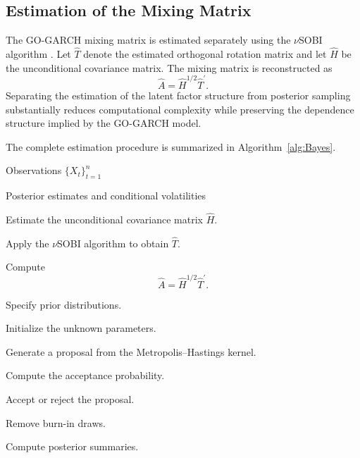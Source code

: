 \documentclass[twoside]{article}
\begin{document}
\subsection{Estimation of the Mixing Matrix}

The GO-GARCH mixing matrix is estimated separately using the \(\nu\)SOBI algorithm \cite{Miettinen2015}. Let \(\widehat{T}\) denote the estimated orthogonal rotation matrix and let \(\widehat{H}\) be the unconditional covariance matrix. The mixing matrix is reconstructed as
\[
\widehat{A}
=
\widehat{H}^{1/2}\widehat{T}^{\prime}.
\]
Separating the estimation of the latent factor structure from posterior sampling substantially reduces computational complexity while preserving the dependence structure implied by the GO-GARCH model.

The complete estimation procedure is summarized in Algorithm~\ref{alg:Bayes}.

\begin{algorithm}[ht]

\caption{Bayesian Estimation of the VAR-GoGARCH Model}

\label{alg:Bayes}

\begin{algorithmic}[1]

\Require Observations $\{X_t\}_{t=1}^{n}$

\Ensure Posterior estimates and conditional volatilities

\State Estimate the unconditional covariance matrix $\widehat{H}$.

\State Apply the $\nu$SOBI algorithm to obtain $\widehat{T}$.

\State Compute
\[
\widehat{A}
=
\widehat{H}^{1/2}\widehat{T}^{\prime}.
\]

\State Specify prior distributions.

\State Initialize the unknown parameters.


\State Generate a proposal from the Metropolis--Hastings kernel.

\State Compute the acceptance probability.

\State Accept or reject the proposal.

\EndFor

\State Remove burn-in draws.

\State Compute posterior summaries.

\end{algorithmic}

\end{algorithm}
\end{document}
